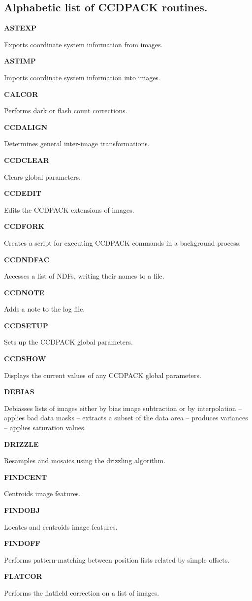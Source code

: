 \documentclass[twoside,11pt]{article}
\newenvironment{latexonly}{}{}
\renewcommand{\_}{\texttt{\symbol{95}}}
\newcommand{\quickdes}[3]{
                         \parbox{1.1in}{\bf #1}
                         \parbox{4.4in}{\raggedright #2 \dotfill}
                         \parbox{0.6in}{\pageref{#3}}
                         \vspace*{0.2in}}
\newcommand{\latexonlysubsection}[1]{\subsection{#1}}
\newcommand{\latexonlysubsection}[1]{#1}
\begin{document}
\newpage
\begin{latexonly}
\latexonlysubsection{Alphabetic list of CCDPACK routines.}
%
%
\quickdes{ASTEXP}{Exports coordinate system information from images.}
         {ASTEXP}

\quickdes{ASTIMP}{Imports coordinate system information into images.}{ASTIMP}

\quickdes{CALCOR}{Performs dark or flash count corrections.}{CALCOR}

\quickdes{CCDALIGN}{Determines general inter-image transformations.}
         {CCDALIGN}

\quickdes{CCDCLEAR}{Clears global parameters.}
         {CCDCLEAR}


\quickdes{CCDEDIT}{Edits the CCDPACK extensions of images.}
         {CCDEDIT}

\quickdes{CCDFORK}{Creates a script for executing CCDPACK
                   commands in a background process.}{CCDFORK}

\quickdes{CCDNDFAC}{Accesses a list of NDFs, writing their names to a file.}
         {CCDNDFAC}

\quickdes{CCDNOTE}{Adds a note to the log file.}{CCDNOTE}

\quickdes{CCDSETUP}{Sets up the CCDPACK global parameters.}{CCDSETUP}

\quickdes{CCDSHOW}{Displays the current values of any CCDPACK global
                   parameters.}{CCDSHOW}

\quickdes{DEBIAS}{Debiasses lists of images either by bias image
                 subtraction or by interpolation --
                 applies bad data masks --
                 extracts a subset of the data area --
                 produces variances --
                 applies saturation values.}
                 {DEBIAS}

\quickdes{DRIZZLE}{Resamples and mosaics using the drizzling algorithm.}
                  {DRIZZLE}

\quickdes{FINDCENT}{Centroids image features.}
                   {FINDCENT}

\quickdes{FINDOBJ}{Locates and centroids image features.}
                  {FINDOBJ}

\quickdes{FINDOFF}{Performs pattern-matching between position lists
                   related by simple offsets.}
                   {FINDOFF}

\newpage

\quickdes{FLATCOR}{Performs the flatfield correction on a list of images.}
                  {FLATCOR}



\end{latexonly}
\end{document}
